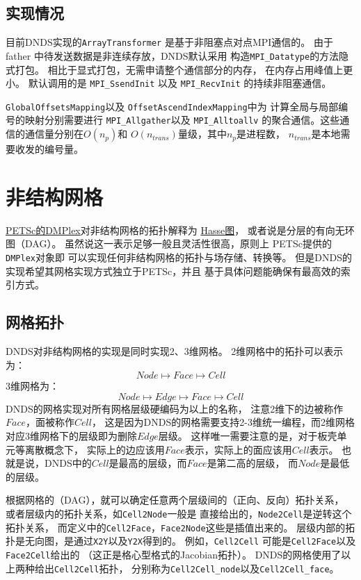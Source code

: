 \documentclass[UTF8,zihao=5]{ctexart} %
\begin{document}
\subsection{实现情况}

目前DNDS实现的\verb|ArrayTransformer|
是基于非阻塞点对点MPI通信的。
由于father
中待发送数据是非连续存放，DNDS默认采用
构造\verb|MPI_Datatype|的方法隐式打包。
相比于显式打包，无需申请整个通信部分的内存，
在内存占用峰值上更小。
默认调用的是
\verb|MPI_SsendInit|
以及
\verb|MPI_RecvInit|
的持续非阻塞通信。

\verb|GlobalOffsetsMapping|以及
\verb|OffsetAscendIndexMapping|中为
计算全局与局部编号的映射分别需要进行
\verb|MPI_Allgather|以及
\verb|MPI_Alltoallv|
的聚合通信。这些通信的通信量分别在$O(n_p)$和
$O(n_{trans})$量级，其中$n_p$是进程数，
$n_{trans}$是本地需要收发的编号量。

\section{非结构网格}

\href{https://PETSc.org/release/manual/dmplex/}
{PETSc的DMPlex}对非结构网格的拓扑解释为
\href{https://en.wikipedia.org/wiki/Hasse_diagram}{Hasse图}，
或者说是分层的有向无环图（DAG）。
虽然说这一表示足够一般且灵活性很高，原则上
PETSc提供的\verb|DMPlex|对象即
可以实现任何非结构网格的拓扑与场存储、转换等。
但是DNDS的实现希望其网格实现方式独立于PETSc，并且
基于具体问题能确保有最高效的索引方式。


\subsection{网格拓扑}

DNDS对非结构网格的实现是同时实现2、3维网格。
2维网格中的拓扑可以表示为：
$$
    Node\mapsto Face\mapsto Cell
$$
3维网格为：
$$
    Node\mapsto Edge \mapsto Face\mapsto Cell
$$
DNDS的网格实现对所有网格层级硬编码为以上的名称，
注意2维下的边被称作$Face$，面被称作$Cell$，
这是因为DNDS的网格需要支持2-3维统一编程，而2维网格
对应3维网格下的层级即为删除$Edge$层级。
这样唯一需要注意的是，对于板壳单元等离散概念下，
实际上的边应该用$Face$表示，实际上的面应该用$Cell$表示。
也就是说，DNDS中的$Cell$是最高的层级，而$Face$是第二高的层级，
而$Node$是最低的层级。

根据网格的（DAG），就可以确定任意两个层级间的（正向、反向）拓扑关系，
或者层级内的拓扑关系，如\verb|Cell2Node|一般是
直接给出的，\verb|Node2Cell|是逆转这个拓扑关系，
而定义中的\verb|Cell2Face|，\verb|Face2Node|这些是插值出来的。
层级内部的拓扑是无向图，是通过\verb|X2Y|以及\verb|Y2X|得到的。
例如，\verb|Cell2Cell|
可能是\verb|Cell2Face|以及\verb|Face2Cell|给出的
（这正是格心型格式的Jacobian拓扑）。
DNDS的网格使用了以上两种给出\verb|Cell2Cell|拓扑，
分别称为\verb|Cell2Cell_node|以及\verb|Cell2Cell_face|。
\end{document}
